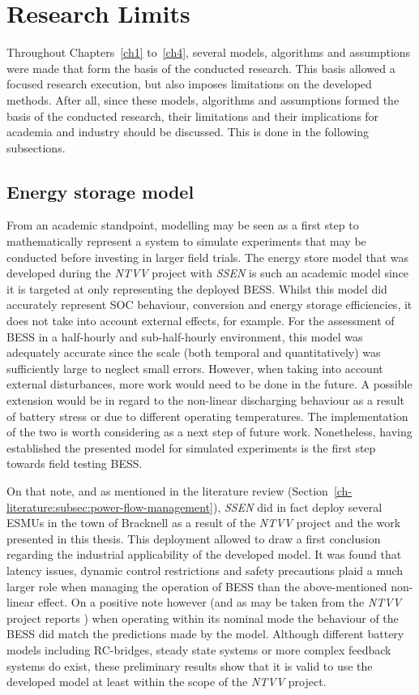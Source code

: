 \section{Research Limits}
\label{ch-conclusions:sec:research-limits}

Throughout Chapters~\ref{ch1} to~\ref{ch4}, several models, algorithms and assumptions were made that form the basis of the conducted research.
This basis allowed a focused research execution, but also imposes limitations on the developed methods.
After all, since these models, algorithms and assumptions formed the basis of the conducted research, their limitations and their implications for academia and industry should be discussed.
This is done in the following subsections.

\subsection{Energy storage model}

From an academic standpoint, modelling may be seen as a first step to mathematically represent a system to simulate experiments that may be conducted before investing in larger field trials.
The energy store model that was developed during the \textit{NTVV} project with \textit{SSEN} is such an academic model since it is targeted at only representing the deployed BESS.
Whilst this model did accurately represent SOC behaviour, conversion and energy storage efficiencies, it does not take into account external effects, for example.
For the assessment of BESS in a half-hourly and sub-half-hourly environment, this model was adequately accurate since the scale (both temporal and quantitatively) was sufficiently large to neglect small errors.
However, when taking into account external disturbances, more work would need to be done in the future.
A possible extension would be in regard to the non-linear discharging behaviour as a result of battery stress or due to different operating temperatures.
The implementation of the two is worth considering as a next step of future work.
Nonetheless, having established the presented model for simulated experiments is the first step towards field testing BESS.

On that note, and as mentioned in the literature review (Section~\ref{ch-literature:subsec:power-flow-management}), \textit{SSEN} did in fact deploy several ESMUs in the town of Bracknell as a result of the \textit{NTVV} project and the work presented in this thesis.
This deployment allowed to draw a first conclusion regarding the industrial applicability of the developed model.
It was found that latency issues, dynamic control restrictions and safety precautions plaid a much larger role when managing the operation of BESS than the above-mentioned non-linear effect.
On a positive note however (and as may be taken from the \textit{NTVV} project reports \cite{NTVV9.8a}) when operating within its nominal mode the behaviour of the BESS did match the predictions made by the model.
Although different battery models including RC-bridges, steady state systems or more complex feedback systems do exist, these preliminary results show that it is valid to use the developed model at least within the scope of the \textit{NTVV} project.

